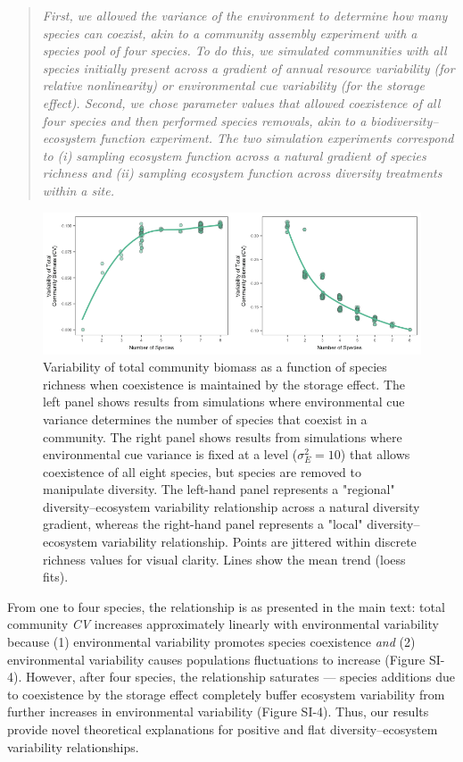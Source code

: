 \documentclass[11pt,]{article}
\begin{document}
\begin{quote}
\emph{First, we allowed the variance of the environment to determine how many species can coexist, akin to a community assembly experiment with a species pool of four species.
To do this, we simulated communities with all species initially present across a gradient of annual resource variability (for relative nonlinearity) or environmental cue variability (for the storage effect).
Second, we chose parameter values that allowed coexistence of all four species and then performed species removals, akin to a biodiversity--ecosystem function experiment.
The two simulation experiments correspond to (i) sampling ecosystem function across a natural gradient of species richness and (ii) sampling ecosystem function across diversity treatments within a site.}
\end{quote}

\begin{figure}[!ht]
  \centering
      \includegraphics[width=6in]{./components/SI_storage_effect_eightspp_local_regional.png}
  \caption{Variability of total community biomass as a function of species richness when coexistence is maintained by the storage effect. The left panel shows results from simulations where environmental cue variance determines the number of species that coexist in a community. The right panel shows results from simulations where environmental cue variance is fixed at a level ($\sigma_E^2=10$) that allows coexistence of all eight species, but species are removed to manipulate diversity. The left-hand panel represents a "regional" diversity--ecosystem variability relationship across a natural diversity gradient, whereas the right-hand panel represents a "local" diversity--ecosystem variability relationship. Points are jittered within discrete richness values for visual clarity. Lines show the mean trend (loess fits).}
\end{figure}

From one to four species, the relationship is as presented in the main
text: total community \emph{CV} increases approximately linearly with
environmental variability because (1) environmental variability promotes
species coexistence \emph{and} (2) environmental variability causes
populations fluctuations to increase (Figure SI-4). However, after four
species, the relationship saturates --- species additions due to
coexistence by the storage effect completely buffer ecosystem
variability from further increases in environmental variability (Figure
SI-4). Thus, our results provide novel theoretical explanations for
positive and flat diversity--ecosystem variability relationships.
\end{document}
